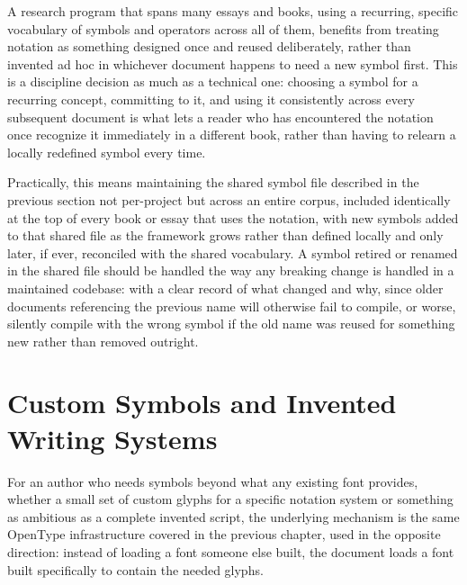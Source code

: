 A research program that spans many essays and books, using a recurring, specific vocabulary of symbols and operators across all of them, benefits from treating notation as something designed once and reused deliberately, rather than invented ad hoc in whichever document happens to need a new symbol first. This is a discipline decision as much as a technical one: choosing a symbol for a recurring concept, committing to it, and using it consistently across every subsequent document is what lets a reader who has encountered the notation once recognize it immediately in a different book, rather than having to relearn a locally redefined symbol every time.

Practically, this means maintaining the shared symbol file described in the previous section not per-project but across an entire corpus, included identically at the top of every book or essay that uses the notation, with new symbols added to that shared file as the framework grows rather than defined locally and only later, if ever, reconciled with the shared vocabulary. A symbol retired or renamed in the shared file should be handled the way any breaking change is handled in a maintained codebase: with a clear record of what changed and why, since older documents referencing the previous name will otherwise fail to compile, or worse, silently compile with the wrong symbol if the old name was reused for something new rather than removed outright.

\hypertarget{custom-symbols-and-invented-writing-systems}{%
\section{Custom Symbols and Invented Writing Systems}\label{custom-symbols-and-invented-writing-systems}}

For an author who needs symbols beyond what any existing font provides, whether a small set of custom glyphs for a specific notation system or something as ambitious as a complete invented script, the underlying mechanism is the same OpenType infrastructure covered in the previous chapter, used in the opposite direction: instead of loading a font someone else built, the document loads a font built specifically to contain the needed glyphs.

